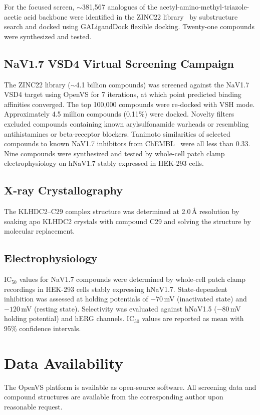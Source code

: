 \documentclass[11pt]{article}
\begin{document}
For the focused screen, ${\sim}$381,567 analogues of the acetyl-amino-methyl-triazole-acetic acid backbone were identified in the ZINC22 library~\citep{tingle2023zinc22} by substructure search and docked using GALigandDock flexible docking. Twenty-one compounds were synthesized and tested.

\subsection{NaV1.7 VSD4 Virtual Screening Campaign}

The ZINC22 library (${\sim}$4.1 billion compounds) was screened against the NaV1.7 VSD4 target using OpenVS for 7 iterations, at which point predicted binding affinities converged. The top 100,000 compounds were re-docked with VSH mode. Approximately 4.5 million compounds (0.11\%) were docked. Novelty filters excluded compounds containing known arylsulfonamide warheads or resembling antihistamines or beta-receptor blockers. Tanimoto similarities of selected compounds to known NaV1.7 inhibitors from ChEMBL~\citep{chembl2024} were all less than 0.33. Nine compounds were synthesized and tested by whole-cell patch clamp electrophysiology on hNaV1.7 stably expressed in HEK-293 cells.

\subsection{X-ray Crystallography}

The KLHDC2--C29 complex structure was determined at 2.0\,\AA{} resolution by soaking apo KLHDC2 crystals with compound C29 and solving the structure by molecular replacement.

\subsection{Electrophysiology}

IC$_{50}$ values for NaV1.7 compounds were determined by whole-cell patch clamp recordings in HEK-293 cells stably expressing hNaV1.7. State-dependent inhibition was assessed at holding potentials of $-70$\,mV (inactivated state) and $-120$\,mV (resting state). Selectivity was evaluated against hNaV1.5 ($-80$\,mV holding potential) and hERG channels. IC$_{50}$ values are reported as mean with 95\% confidence intervals.

\section{Data Availability}

The OpenVS platform is available as open-source software. All screening data and compound structures are available from the corresponding author upon reasonable request.



\end{document}
